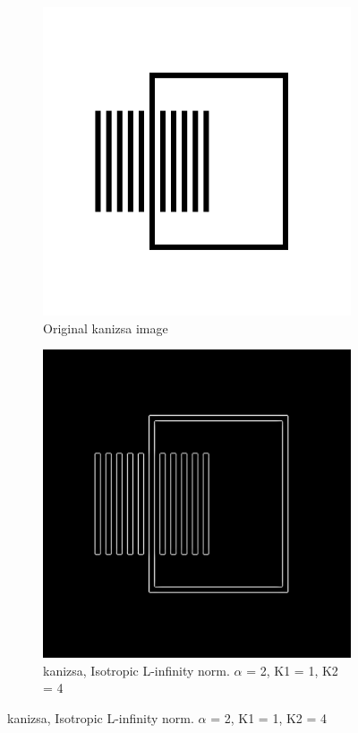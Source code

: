\begin{figure}[H]
  \centering

\begin{subfigure}{.7\textwidth}
    \centering
    \includegraphics[width=.9\textwidth]{./canny/kanizsa}
    \caption{Original kanizsa image}
    \label{fig:kanizsa}
  \end{subfigure}%
  
    \begin{subfigure}{.7\textwidth}
    \centering
    \includegraphics[width=.9\textwidth]{./canny/kanizsa_LINF_a2_k11_k24}
    \caption{kanizsa, Isotropic L-infinity norm. $\alpha$ = 2, K1 = 1, K2 = 4}
    \label{fig:kanizsa_LINF_a2_k11_k24}
  \end{subfigure}%

\end{figure}

